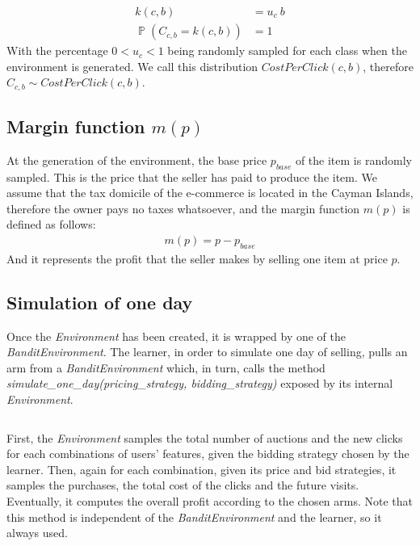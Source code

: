 \documentclass[11pt]{article} %
\DeclareMathOperator{\Prob}{\mathbb{P}}
\begin{document}
\begin{align*}
k(c,b) &= u_c\  b\\
\Prob(C_{c,b} = k(c,b)) &= 1
\end{align*}
With the percentage $0 < u_c < 1$ being randomly sampled for each class when the environment is generated.
We call this distribution $CostPerClick(c,b)$, therefore $C_{c,b}\sim CostPerClick(c,b)$.

\subsection{Margin function $m(p)$}
At the generation of the environment, the base price $p_{base}$ of the item is randomly sampled. This is the price that the seller has paid to produce the item. We assume that the tax domicile of the e-commerce is located in the Cayman Islands, therefore the owner pays no taxes whatsoever, and the margin function $m(p)$ is defined as follows:
\begin{align*}
m(p)=p-p_{base}
\end{align*}
And it represents the profit that the seller makes by selling one item at price $p$.

\subsection{Simulation of one day}
Once the \textit{Environment} has been created, it is wrapped by one of the \textit{BanditEnvironment}.  The learner, in order to simulate one day of selling, pulls an arm from a \textit{BanditEnvironment} which, in turn, calls the method \textit{simulate\_one\_day(pricing\_strategy, bidding\_strategy)} exposed by its internal \textit{Environment}. 
\inputminted[fontsize=\footnotesize]{python}{code/simulation_one_day.py}
First, the \textit{Environment} samples the total number of auctions and the new clicks for each combinations of users' features, given the bidding strategy chosen by the learner. Then, again for each combination, given its price and bid strategies, it samples the purchases, the total cost of the clicks and the future visits. Eventually, it computes the overall profit according to the chosen arms.
\newline Note that this method is independent of the \textit{BanditEnvironment} and the learner, so it always used.

\clearpage
\end{document}
